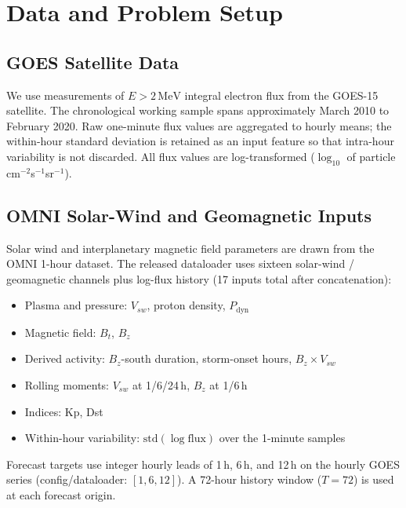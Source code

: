 \documentclass{ieeeaccess}
\begin{document}
\section{Data and Problem Setup}
\label{sec:data}

\subsection{GOES Satellite Data}
We use measurements of \(E>2\,\mathrm{MeV}\) integral electron flux from the
GOES-15 satellite. The chronological working sample spans approximately March 2010
to February 2020. Raw one-minute flux values are aggregated to hourly means;
the within-hour standard deviation is retained as an input feature so that
intra-hour variability is not discarded. All flux values are log-transformed
(\(\log_{10}\) of particle cm\(^{-2}\)s\(^{-1}\)sr\(^{-1}\)).

\subsection{OMNI Solar-Wind and Geomagnetic Inputs}
Solar wind and interplanetary magnetic field parameters are drawn from the OMNI
1-hour dataset. The released dataloader uses sixteen solar-wind / geomagnetic channels plus log-flux history (17 inputs total after concatenation):
\begin{itemize}
\item Plasma and pressure: \(V_{sw}\), proton density, \(P_{\mathrm{dyn}}\)
\item Magnetic field: \(B_t\), \(B_z\)
\item Derived activity: \(B_z\)-south duration, storm-onset hours, \(B_z\times V_{sw}\)
\item Rolling moments: \(V_{sw}\) at 1/6/24\,h, \(B_z\) at 1/6\,h
\item Indices: Kp, Dst
\item Within-hour variability: \(\mathrm{std}(\log\mathrm{flux})\) over the 1-minute samples
\end{itemize}
Forecast targets use integer hourly leads of 1\,h, 6\,h, and 12\,h on the hourly GOES series (config/dataloader: $[1,6,12]$). A 72-hour history window (\(T=72\)) is used at each forecast origin.
\end{document}
